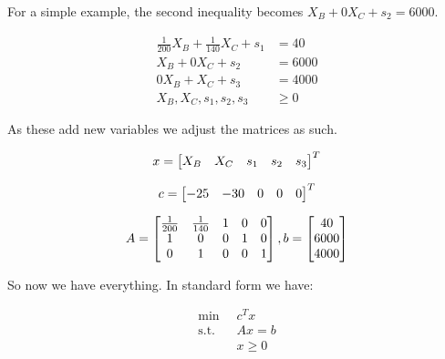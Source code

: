 For a simple example, the second inequality becomes $X_B + 0X_C + s_2 = 6000$. 

\begin{align*}
	\frac{1}{200} X_B + \frac{1}{140}X_C + s_1 &= 40 \\
	X_B + 0X_C + s_2 &= 6000 \\
	0X_B + X_C + s_3 &= 4000 \\
	X_B, X_C, s_1, s_2, s_3 &\geq 0
\end{align*}


As these add new variables we adjust the matrices as such.

\[x = \m{b}{X_B & X_C & s_1 & s_2 & s_3}^T\]

\[c = \m{b}{-25 & -30 & 0 & 0 & 0}^T\]

\[
	A = \m{b}{\frac{1}{200} & \frac{1}{140} & 1 & 0 & 0 \\ 
	1 & 0 & 0 & 1 & 0 \\
	0 & 1 & 0 & 0 & 1}, 
	b = \m{b}{40 \\ 6000 \\ 4000}
\]

So now we have everything. In standard form we have:

\begin{align*}
	\min \;\; & c^T x \\
	\text{s.t.} \;\; & Ax = b \\ 
	& x \geq 0
\end{align*}

